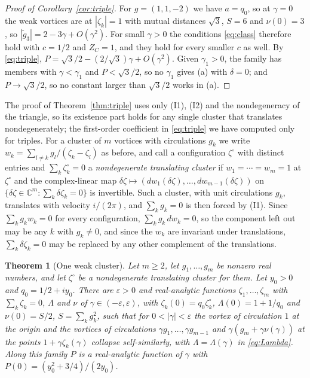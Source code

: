 \documentclass[11pt]{article}
\newtheorem{theorem}{Theorem}
\theoremstyle{definition}
\newcommand{\C}{\mathbb{C}}
\begin{document}
\begin{proof}[Proof of Corollary~\ref{cor:triple}]
For $g = (1, 1, -2)$ we have $a = q_0$, so at $\gamma = 0$ the weak vortices are at $|\zeta_k| = 1$ with mutual distances $\sqrt{3}$, $S = 6$ and $\nu(0) = 3$, so $|\tilde g_3| = 2 - 3\gamma + O(\gamma^2)$. For small $\gamma > 0$ the conditions \eqref{eq:class} therefore hold with $c = 1/2$ and $Z_C = 1$, and they hold for every smaller $c$ as well. By \eqref{eq:triple}, $P = \sqrt{3}/2 - (2/\sqrt{3})\gamma + O(\gamma^2)$. Given $\gamma_1 > 0$, the family has members with $\gamma < \gamma_1$ and $P < \sqrt{3}/2$, so no $\gamma_1$ gives (a) with $\delta = 0$; and $P \to \sqrt{3}/2$, so no constant larger than $\sqrt{3}/2$ works in (a).
\end{proof}

The proof of Theorem~\ref{thm:triple} uses only (I1), (I2) and the nondegeneracy of the triangle, so its existence part holds for any single cluster that translates nondegenerately; the first-order coefficient in \eqref{eq:triple} we have computed only for triples. For a cluster of $m$ vortices with circulations $g_k$ we write $w_k = \sum_{l \ne k} g_l/(\zeta_k - \zeta_l)$ as before, and call a configuration $\zeta^\circ$ with distinct entries and $\sum_k\zeta^\circ_k = 0$ a \emph{nondegenerate translating cluster} if $w_1 = \cdots = w_m = 1$ at $\zeta^\circ$ and the complex-linear map $\delta\zeta \mapsto (dw_1(\delta\zeta), \ldots, dw_{m-1}(\delta\zeta))$ on $\{\delta\zeta \in \C^m: \sum_k\delta\zeta_k = 0\}$ is invertible. Such a cluster, with unit circulations $g_k$, translates with velocity $i/(2\pi)$, and $\sum_kg_k = 0$ is then forced by (I1). Since $\sum_kg_kw_k = 0$ for every configuration, $\sum_kg_k\,dw_k = 0$, so the component left out may be any $k$ with $g_k \ne 0$, and since the $w_k$ are invariant under translations, $\sum_k\delta\zeta_k = 0$ may be replaced by any other complement of the translations.

\begin{theorem}[One weak cluster]\label{thm:cluster}
Let $m \ge 2$, let $g_1, \ldots, g_m$ be nonzero real numbers, and let $\zeta^\circ$ be a nondegenerate translating cluster for them. Let $y_0 > 0$ and $q_0 = 1/2 + iy_0$. There are $\varepsilon > 0$ and real-analytic functions $\zeta_1, \ldots, \zeta_m$ with $\sum_k\zeta_k = 0$, $\Lambda$ and $\nu$ of $\gamma \in (-\varepsilon, \varepsilon)$, with $\zeta_k(0) = q_0\zeta^\circ_k$, $\Lambda(0) = 1 + 1/q_0$ and $\nu(0) = S/2$, $S = \sum_kg_k^2$, such that for $0 < |\gamma| < \varepsilon$ the vortex of circulation $1$ at the origin and the vortices of circulations $\gamma g_1, \ldots, \gamma g_{m-1}$ and $\gamma(g_m + \gamma\nu(\gamma))$ at the points $1 + \gamma\zeta_k(\gamma)$ collapse self-similarly, with $\Lambda = \Lambda(\gamma)$ in \eqref{eq:Lambda}. Along this family $P$ is a real-analytic function of $\gamma$ with $P(0) = (y_0^2 + 3/4)/(2y_0)$.
\end{theorem}
\end{document}
